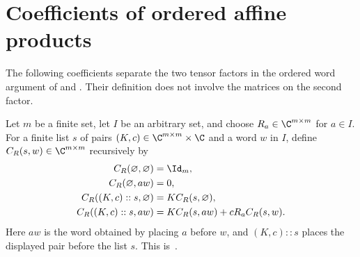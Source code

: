 \section{Coefficients of ordered affine products}

The following coefficients separate the two tensor factors in the ordered
word argument of
\cite[Proposition~5.7]{Arad2016RigorousRG} and
\cite[Lemma~4.2]{Arad2013AreaLaw}. Their definition does not
involve the matrices on the second factor.

\begin{definition}
    \label{def:core_word_coefficients}
    \leanok
    Let $m$ be a finite set, let $I$ be an arbitrary set, and choose
    $R_a\in\C^{m\times m}$ for $a\in I$. For a finite list $s$ of pairs
    $(K,c)\in\C^{m\times m}\times\C$ and a word $w$ in $I$, define
    $C_R(s,w)\in\C^{m\times m}$ recursively by
    \begin{align}
        C_R(\varnothing,\varnothing) & =\Id_m,\notag                \\
        C_R(\varnothing,aw)          & =0,\notag                    \\
        C_R((K,c)::s,\varnothing)    & =K C_R(s,\varnothing),\notag \\
        C_R((K,c)::s,aw)             & =K C_R(s,aw)+cR_a C_R(s,w).
        \label{eq:core_word_recursion}
    \end{align}
    Here $aw$ is the word obtained by placing $a$ before $w$, and $(K,c)::s$
    places the displayed pair before the list $s$.
    This is~\cite[``Retained word coefficients'']{QICLean2026Blueprint}.
\end{definition}

